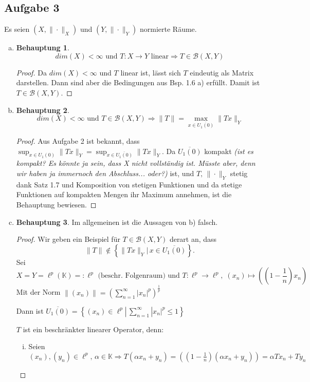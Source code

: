 \documentclass[ngerman]{report}
\theoremstyle{plain}%
\theoremstyle{definition}%
\theoremstyle{myStyle}
\newtheorem*{beh}{Behauptung}
\newcommand{\K}{\mathbb{K}}
\newcommand{\B}{\mathcal{B}} %
\newcommand{\df}{\Rightarrow} %
\begin{document}
\subsection{Aufgabe 3}
Es seien $(X, \| \cdot \|_X)$ und $(Y, \| \cdot \|_Y)$ normierte Räume.
\begin{enumerate}[(a)]
\item

\begin{beh}
$$dim(X) < \infty \text{ und } T:X\to Y \text{ linear}\df T \in \B(X,Y)$$
\end{beh}
\begin{proof}
Da $dim(X) <\infty$ und $T$ linear ist, lässt sich $T$ eindeutig als Matrix darstellen. Dann sind aber die Bedingungen aus Bsp. 1.6 a) erfüllt. Damit ist $T \in \B(X,Y)$.
\end{proof}

\item

\begin{beh}
$$dim(X)<\infty \text{ und } T\in\B(X,Y) \df \|T\|= \max_{x\in\overline{U_1(0)}}\|Tx\|_Y$$
\end{beh}
\begin{proof}
Aus Aufgabe 2 ist bekannt, dass $\displaystyle\sup_{x\in U_1(0)} \|Tx\|_Y = \sup_{x\in\overline{U_1(0)}}\|Tx\|_Y$. Da $\overline{U_1(0)}$ kompakt \textit{(ist es kompakt? Es könnte ja sein, dass X nicht vollständig ist. Müsste aber, denn wir haben ja immernoch den Abschluss... oder?) } ist, und $T,\,\|\cdot\|_Y$ stetig dank Satz 1.7 und Komposition von stetigen Funktionen und da stetige Funktionen auf kompakten Mengen ihr Maximum annehmen, ist die Behauptung bewiesen.
\end{proof}

\item

\begin{beh}
Im allgemeinen ist die Aussagen von b) falsch.
\end{beh}
\begin{proof}
Wir geben ein Beispiel für $T\in\B(X,Y)$ derart an, dass 
$$\|T\| \not\in\left\lbrace\|Tx\|_Y|\,x\in\overline{U_1(0)}\right\rbrace.$$
Sei  $$X=Y=\ell^p(\K)=:\ell^p \text{ (beschr. Folgenraum) und } T:\ell^p\to \ell^p,\;(x_n)\mapsto \left(\left(1-\frac{1}{n}\right)x_n\right)$$
Mit der Norm $\displaystyle \|(x_n)\|=\left(\sum^\infty_{n=1} |x_n|^p\right)^{\frac{1}{p}}$\par
Dann ist $\overline{U_1(0)} = \left\lbrace (x_n) \in \ell^p |\,\sum^\infty_{n=1} |x_n|^p \leq 1 \right\rbrace$\par
$T$ ist ein beschränkter linearer Operator, denn:
\begin{enumerate}[(i)]
\item Seien $(x_n),(y_n)\in \ell^p,\,\alpha \in \K\df T(\alpha x_n + y_n) = \left(\left(1-\frac{1}{n}\right)(\alpha x_n + y_n) \right) = \alpha Tx_n + Ty_n$


\end{enumerate}
\end{proof}
\end{enumerate}
\end{document}
